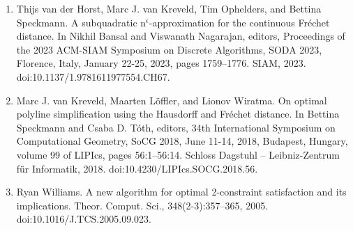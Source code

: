 \documentclass[10pt,a4paper]{article}
\begin{document}
\begin{enumerate}
\item[]  [27]  Thijs van der Horst, Marc J. van Kreveld, Tim Ophelders, and Bettina Speckmann.  A subquadratic n${}^{\mbox{{$\epsilon$}}}$-approximation for the continuous Fréchet distance.  In Nikhil Bansal and Viswanath Nagarajan, editors, Proceedings of the 2023 ACM-SIAM Symposium on Discrete Algorithms, SODA 2023, Florence, Italy, January 22-25, 2023, pages 1759–1776. SIAM, 2023.  doi:10.1137/1.9781611977554.CH67.  
\item[]  [28]  Marc J. van Kreveld, Maarten Löffler, and Lionov Wiratma.  On optimal polyline simplification using the Hausdorff and Fréchet distance.  In Bettina Speckmann and Csaba D. Tóth, editors, 34th International Symposium on Computational Geometry, SoCG 2018, June 11-14, 2018, Budapest, Hungary, volume 99 of LIPIcs, pages 56:1–56:14. Schloss Dagstuhl – Leibniz-Zentrum für Informatik, 2018.  doi:10.4230/LIPIcs.SOCG.2018.56.  
\item[]  [29]  Ryan Williams.  A new algorithm for optimal 2-constraint satisfaction and its implications.  Theor. Comput. Sci., 348(2-3):357–365, 2005.  doi:10.1016/J.TCS.2005.09.023.  
\end{enumerate}
\end{document}
